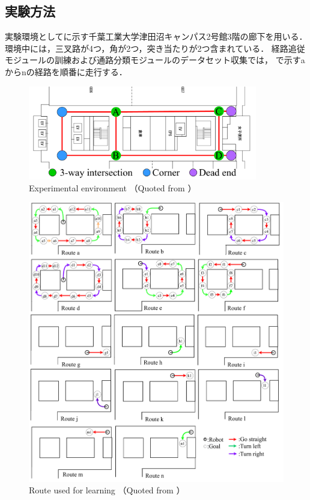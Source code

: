 \subsection{実験方法}
実験環境としてに示す千葉工業大学津田沼キャンパス2号館3階の廊下を用いる．
環境中には，三叉路が4つ，角が2つ，突き当たりが2つ含まれている．
経路追従モジュールの訓練および通路分類モジュールのデータセット収集では，
で示すaからnの経路を順番に走行する．
\begin{figure}[htbp]
    \centering
     \includegraphics[width=100mm]{images/pdf/cit3f.pdf}
     \caption{Experimental environment （Quoted from \cite{haruyama2023}）}\label{fig:cit3f}
\end{figure}
\begin{figure}[htbp]
    \centering
     \includegraphics[width=130mm]{images/pdf/si_route.pdf}
     \caption{Route used for learning （Quoted from \cite{haruyama2023}）}\label{fig:newroute}
\end{figure}


